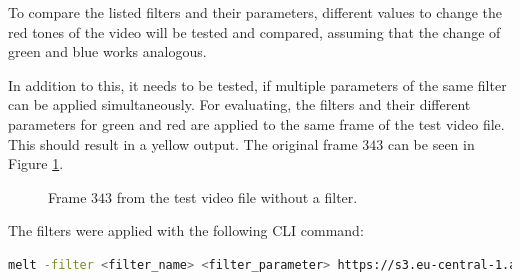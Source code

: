 \documentclass[../MasterThesis.tex]{subfiles}
\begin{document}



%


To compare the listed filters and their parameters, different values to change the red tones of the video will be tested and compared, assuming that the change of green and blue works analogous.

In addition to this, it needs to be tested, if multiple parameters of the same filter can be applied simultaneously. For evaluating, the filters and their different parameters for green and red are applied to the same frame of the test video file. This should result in a yellow output. The original frame $343$ can be seen in Figure \ref{figure:nofilter}.

\begin{figure}[H]
	\begin{center}
		\caption[Frame $343$ from the test video file without a filter.]{Frame $343$ from the test video file without a filter.}
		\label{figure:nofilter}
	\end{center}
\end{figure}

The filters were applied with the following CLI command:
\begin{lstlisting}[language=bash, numbers=none]
	melt -filter <filter_name> <filter_parameter> https://s3.eu-central-1.amazonaws.com/accurate-player-demo-assets/timecode/sintel-2048-timecode-stereo.mp4 -consumer xgl
\end{lstlisting}
\end{document}
